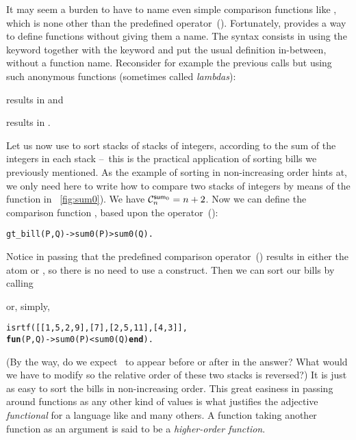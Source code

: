 It may seem a burden to have to name even simple comparison functions
like , which is none other than the predefined
operator~(\erlcode{<}). Fortunately, \Erlang provides a way to define
functions without giving them a name. The syntax consists in using the
keyword  together with the keyword  and put
the usual definition in\hyp{}between, without a function
name. Reconsider for example the previous calls but using such
anonymous functions (sometimes called \emph{lambdas}):
\begin{center}
\end{center}
results in \erlcode{[1,2,3,4,5]} and
\begin{center}
\end{center}
results in \erlcode{[5,4,3,2,1]}.

Let us now use  to sort stacks of stacks of integers,
according to the sum of the integers in each stack --~this is the
practical application of sorting bills we previously mentioned. As the
example of sorting in non\hyp{}increasing order hints at, we only need
here to write how to compare two stacks of integers by means of the
 function in \fig~\vref{fig:sum0}). We have
\(\C{\fun{sum}_0}{n} = n + 2\). Now we can define the comparison
function , based upon the operator~(\erlcode{>}):
\begin{alltt}
gt\_bill(P,Q) -> sum0(P) > sum0(Q).
\end{alltt}
Notice in passing that the predefined \Erlang comparison
operator~(\erlcode{>}) results in either the atom  or
, so there is no need to use a 
construct. Then we can sort our bills by calling
\begin{center}
\end{center}
or, simply,
\begin{alltt}
      isrtf([[1,5,2,9],[7],[2,5,11],[4,3]],
            \textbf{fun}(P,Q) -> sum0(P) < sum0(Q) \textbf{end}).
\end{alltt}
(By the way, do we expect~\erlcode{[7]} to appear before or after
\erlcode{[4,3]} in the answer? What would we have to modify so the
relative order of these two stacks is reversed?) It is just as easy to
sort the bills in non\hyp{}increasing order. This great easiness in
passing around functions as any other kind of values is what justifies
the adjective \emph{functional} for a language like \Erlang and many
others. A function taking another function as an argument is said to
be a \emph{higher\hyp{}order function}.  

